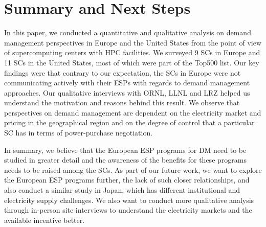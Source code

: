 \section{Summary and Next Steps}
\label{summary}

In this paper, we conducted a quantitative and qualitative analysis on demand management perspectives in Europe and the United States from the point of view of supercomputing centers with HPC facilities. We surveyed 9 SCs in Europe and 11 SCs in the United States, most of which were part of the Top500 list.  Our key findings were that contrary to our expectation, the SCs in Europe were not communicating actively with their ESPs with regards to demand management approaches. Our qualitative interviews with ORNL, LLNL and LRZ helped us understand the motivation and reasons behind this result. We observe that perspectives on demand management are dependent on the electricity market and pricing in the geographical region and on the degree of control that a particular SC has in terms of power-purchase negotiation.

In summary, we believe that the European ESP programs for DM need to be studied in greater detail and the awareness of the benefits for these programs needs to be raised among the SCs. As part of our future work, we want to explore the European ESP programs further, the lack of such closer relationships, and also conduct a similar study in Japan, which has different institutional and electricity supply challenges. We also want to conduct more qualitative analysis through in-person site interviews to understand the electricity markets and the available incentive better. 

